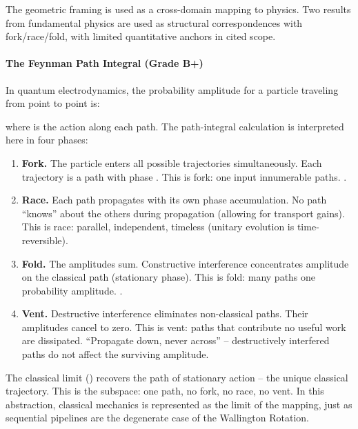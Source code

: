 \documentclass[
]{article}
\providecommand{\tightlist}{%
  \setlength{\itemsep}{0pt}\setlength{\parskip}{0pt}}
\begin{document}
The geometric framing is used as a cross-domain mapping to physics. Two
results from fundamental physics are used as structural correspondences
with fork/race/fold, with limited quantitative anchors in cited scope.

\paragraph{\texorpdfstring{\textbf{The Feynman Path Integral (Grade
B+)}}{The Feynman Path Integral (Grade B+)}}\label{the-feynman-path-integral-grade-b}

In quantum electrodynamics, the probability amplitude for a particle
traveling from point to point is:

where is the action along each path. The path-integral calculation is
interpreted here in four phases:

\begin{enumerate}
\def\labelenumi{\arabic{enumi}.}
\tightlist
\item
  \textbf{Fork.} The particle enters all possible trajectories
  simultaneously. Each trajectory is a path with phase . This is fork:
  one input innumerable paths. .\\
\item
  \textbf{Race.} Each path propagates with its own phase accumulation.
  No path ``knows'' about the others during propagation (allowing for
  transport gains). This is race: parallel, independent, timeless
  (unitary evolution is time-reversible).\\
\item
  \textbf{Fold.} The amplitudes sum. Constructive interference
  concentrates amplitude on the classical path (stationary phase). This
  is fold: many paths one probability amplitude. .\\
\item
  \textbf{Vent.} Destructive interference eliminates non-classical
  paths. Their amplitudes cancel to zero. This is vent: paths that
  contribute no useful work are dissipated. ``Propagate down, never
  across'' -- destructively interfered paths do not affect the surviving
  amplitude.
\end{enumerate}

The classical limit () recovers the path of stationary action -- the
unique classical trajectory. This is the subspace: one path, no fork, no
race, no vent. In this abstraction, classical mechanics is represented
as the limit of the mapping, just as sequential pipelines are the
degenerate case of the Wallington Rotation.
\end{document}
